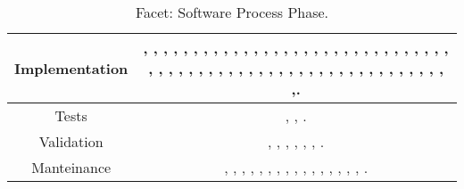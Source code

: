 \begin{table}
\begin{tabular}{|c|c|}
\\ \hline
Implementation		&
\parbox{0.6\textwidth}{\cite{p001}, \cite{p008}, \cite{p020}, \cite{p021}, \cite{p022}, \cite{p029}, \cite{p030}, \cite{p032}, \cite{p033}, \cite{p039}, \cite{p040}, \cite{p046}, \cite{p049}, \cite{p050}, \cite{p051}, \cite{p053}, \cite{p054}, \cite{p058}, \cite{p059}, \cite{p060}, \cite{p062}, \cite{p063}, \cite{p064}, \cite{p065}, \cite{p068}, \cite{p071}, \cite{p072}, \cite{p073}, \cite{p075}, \cite{p079}, \cite{p080}, \cite{p081}, \cite{p086}, \cite{p087}, \cite{p096}, \cite{p105}, \cite{p106}, \cite{p107}, \cite{p111}, \cite{p113}, \cite{p114}, \cite{p115}, \cite{p116}, \cite{p117}, \cite{p119}, \cite{p121}, \cite{p122}, \cite{p124}, \cite{p125}, \cite{p126}, \cite{p137}, \cite{p138}, \cite{p142}, \cite{p143}, \cite{p144}, \cite{p145}, \cite{p151}, \cite{p158}, \cite{p159}, \cite{p160}, \cite{p161}, \cite{p167},\cite{p169}.}
\\ \hline
Tests	&	
\parbox{0.6\textwidth}{\cite{p105}, \cite{p108}, \cite{p124}.}
\\ \hline
Validation	&	
\parbox{0.6\textwidth}{\cite{p021}, \cite{p035}, \cite{p076}, \cite{p105}, \cite{p112}, \cite{p114}\cite{p124}, \cite{p140}.}
\\ \hline
Manteinance &	
\parbox{0.6\textwidth}{\cite{p028}, \cite{p030}, \cite{p033}, \cite{p038}, \cite{p080}, \cite{p081}, \cite{p082}, \cite{p086}, \cite{p087}, \cite{p089}, \cite{p107}, \cite{p109}, \cite{p113}, \cite{p122}, \cite{p124}, \cite{p141}, \cite{p160}.}
\\ \hline
\end{tabular}
\caption{\label{table:biblioSPP} Facet: Software Process Phase.}
\end{table}

